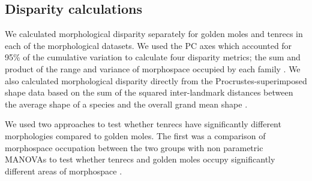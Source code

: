 \documentclass[12pt,a4paper]{article}
\begin{document}
	
\subsection{Disparity calculations}

	We calculated morphological disparity separately for golden moles and tenrecs in each of the morphological datasets. We used the PC axes which accounted for 95\% of the cumulative variation to calculate four disparity metrics; the sum and product of the range and variance of morphospace occupied by each family \citep{Brusatte2008, Foth2012, Ruta2013}. We also calculated morphological disparity directly from the Procrustes-superimposed shape data based on the sum of the squared inter-landmark distances between the average shape of a species and the overall grand mean shape \citep[SSqDist,][]{Zelditch2012}. 

	We used two approaches to test whether tenrecs have significantly different morphologies compared to golden moles. The first was a comparison of morphospace occupation between the two groups with non parametric MANOVAs \citep{Anderson2001} to test whether tenrecs and golden moles occupy significantly different areas of morphospace \citep[e.g][]{Serb2011, Ruta2013}.
	 
\end{document}
